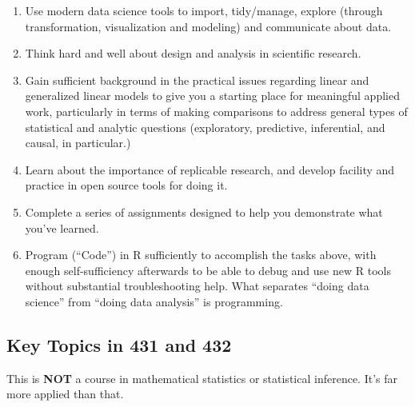 \documentclass[
]{book}
\providecommand{\tightlist}{%
  \setlength{\itemsep}{0pt}\setlength{\parskip}{0pt}}
\begin{document}
\begin{enumerate}
\def\labelenumi{\arabic{enumi}.}
\tightlist
\item
  Use modern data science tools to import, tidy/manage, explore (through transformation, visualization and modeling) and communicate about data.
\item
  Think hard and well about design and analysis in scientific research.
\item
  Gain sufficient background in the practical issues regarding linear and generalized linear models to give you a starting place for meaningful applied work, particularly in terms of making comparisons to address general types of statistical and analytic questions (exploratory, predictive, inferential, and causal, in particular.)
\item
  Learn about the importance of replicable research, and develop facility and practice in open source tools for doing it.
\item
  Complete a series of assignments designed to help you demonstrate what you've learned.
\item
  Program (``Code'') in R sufficiently to accomplish the tasks above, with enough self-sufficiency afterwards to be able to debug and use new R tools without substantial troubleshooting help. What separates ``doing data science'' from ``doing data analysis'' is programming.
\end{enumerate}

\hypertarget{key-topics-in-431-and-432}{%
\subsection{Key Topics in 431 and 432}\label{key-topics-in-431-and-432}}

This is \textbf{NOT} a course in mathematical statistics or statistical inference. It's far more applied than that.
\end{document}
